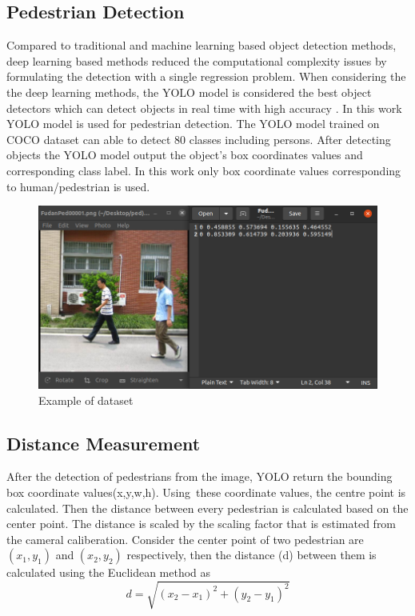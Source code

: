 \documentclass[conference]{IEEEtran}
\begin{document}
\subsection{Pedestrian Detection}
Compared to traditional and machine learning based object detection methods, deep learning based methods reduced the computational complexity issues by formulating the detection with a single regression problem. When considering the the deep learning methods, the YOLO model is considered the best object detectors which can detect objects in real time with high accuracy \cite{yoloreal}. In this work YOLO model is used for pedestrian detection. The YOLO model trained on COCO dataset can able to detect 80 classes including persons. After detecting objects the YOLO model output the object's box coordinates values and corresponding class label. In this work only box coordinate values corresponding to human/pedestrian is used.
\begin{figure}[!h]
	\includegraphics[width=\columnwidth]{./images/dataset.png}
	\caption{Example of dataset}
	\label{dataset}
\end{figure}

\subsection{Distance Measurement}
After the detection of pedestrians from the image, YOLO return the bounding box coordinate values(x,y,w,h). Using these coordinate values, the centre point is calculated. Then the distance between every pedestrian is calculated based on the center point. The distance is scaled by the scaling factor that is estimated from the cameral caliberation. Consider the center point of two pedestrian are $(x_1,y_1)$ and $(x_2,y_2)$ respectively, then the distance (d) between them is calculated using the Euclidean method as 
\begin{equation}
	d = \sqrt{(x_2-x_1)^2+(y_2-y_1)^2}
\end{equation}
\end{document}
